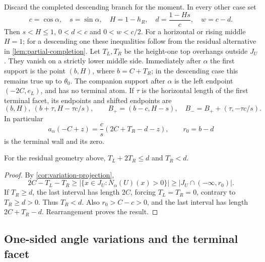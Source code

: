 Discard the completed descending branch for the moment. In every
other case set
\begin{equation}\label{eq:partial-tail-data}
 c=\cos\alpha,\quad s=\sin\alpha,\quad H=1-h_R,
 \quad d=\frac{1-Hs}{c},\quad w=c-d.
\end{equation}
Then $s<H\le1$, $0<d<c$ and $0<w<c/2$.
For a horizontal or rising middle $H=1$; for a descending one
these inequalities follow from the residual alternative in
\cref{lem:partial-completion}.
Let $T_L,T_R$ be the height-one top overhangs outside $J_U$.
They vanish on a strictly lower middle side. Immediately after
$\alpha$ the first support is the point $(b,H)$, where
$b=C+T_R$; in the descending case this remains true up to
$\theta_0$. The companion support after $\alpha$ is the left
endpoint $(-2C,e_L)$, and has no terminal atom.
If $\tau$ is the horizontal length of the first terminal facet,
its endpoints and shifted endpoints are
\begin{equation}\label{eq:partial-terminal-facet}
 (b,H),\ (b+\tau,H-\tau c/s),\qquad
 B_+=(b-c,H-s),\quad B_-=B_++(\tau,-\tau c/s).
\end{equation}
In particular
\begin{equation}\label{eq:partial-terminal-wall}
 a_\alpha(-C+z)=\frac cs(2C+T_R-d-z),\qquad
 r_0=b-d
\end{equation}
is the terminal wall and its zero.

\begin{lemma}\label{lem:partial-top-projection}
For the residual geometry above, $T_L+2T_R\le d$ and $T_R<d$.
\end{lemma}
\begin{proof}
By \cref{cor:variation-projection},
\[
 2C-T_L-T_R\ge|\{x\in J_U:N_\alpha(U)(x)>0\}|
       \ge|J_U\cap(-\infty,r_0)|.
\]
If $T_R\ge d$, the last interval has length $2C$, forcing
$T_L=T_R=0$, contrary to $T_R\ge d>0$.
Thus $T_R<d$. Also $r_0>C-c>0$, and the last interval has
length $2C+T_R-d$. Rearrangement proves the result.
\end{proof}

\subsection{One-sided angle variations and the terminal facet}

